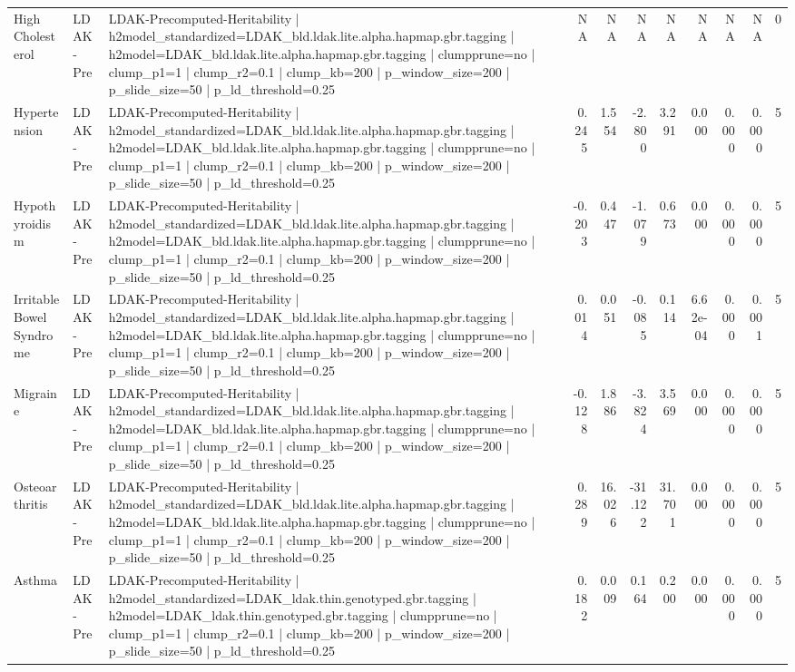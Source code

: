 \begin{landscape}
\begin{longtable}{p{2.4cm}p{1.8cm}p{6.0cm}rrrrrrrr}
High Cholesterol & LDAK-Pre & LDAK-Precomputed-Heritability | h2model\_standardized=LDAK\_bld.ldak.lite.alpha.hapmap.gbr.tagging | h2model=LDAK\_bld.ldak.lite.alpha.hapmap.gbr.tagging | clumpprune=no | clump\_p1=1 | clump\_r2=0.1 | clump\_kb=200 | p\_window\_size=200 | p\_slide\_size=50 | p\_ld\_threshold=0.25 & NA & NA & NA & NA & NA & NA & NA & 0 \\
Hypertension & LDAK-Pre & LDAK-Precomputed-Heritability | h2model\_standardized=LDAK\_bld.ldak.lite.alpha.hapmap.gbr.tagging | h2model=LDAK\_bld.ldak.lite.alpha.hapmap.gbr.tagging | clumpprune=no | clump\_p1=1 | clump\_r2=0.1 | clump\_kb=200 | p\_window\_size=200 | p\_slide\_size=50 | p\_ld\_threshold=0.25 & 0.245 & 1.554 & -2.800 & 3.291 & 0.000 & 0.000 & 0.000 & 5 \\
Hypothyroidism & LDAK-Pre & LDAK-Precomputed-Heritability | h2model\_standardized=LDAK\_bld.ldak.lite.alpha.hapmap.gbr.tagging | h2model=LDAK\_bld.ldak.lite.alpha.hapmap.gbr.tagging | clumpprune=no | clump\_p1=1 | clump\_r2=0.1 | clump\_kb=200 | p\_window\_size=200 | p\_slide\_size=50 | p\_ld\_threshold=0.25 & -0.203 & 0.447 & -1.079 & 0.673 & 0.000 & 0.000 & 0.000 & 5 \\
Irritable Bowel Syndrome & LDAK-Pre & LDAK-Precomputed-Heritability | h2model\_standardized=LDAK\_bld.ldak.lite.alpha.hapmap.gbr.tagging | h2model=LDAK\_bld.ldak.lite.alpha.hapmap.gbr.tagging | clumpprune=no | clump\_p1=1 | clump\_r2=0.1 | clump\_kb=200 | p\_window\_size=200 | p\_slide\_size=50 | p\_ld\_threshold=0.25 & 0.014 & 0.051 & -0.085 & 0.114 & 6.62e-04 & 0.000 & 0.001 & 5 \\
Migraine & LDAK-Pre & LDAK-Precomputed-Heritability | h2model\_standardized=LDAK\_bld.ldak.lite.alpha.hapmap.gbr.tagging | h2model=LDAK\_bld.ldak.lite.alpha.hapmap.gbr.tagging | clumpprune=no | clump\_p1=1 | clump\_r2=0.1 | clump\_kb=200 | p\_window\_size=200 | p\_slide\_size=50 | p\_ld\_threshold=0.25 & -0.128 & 1.886 & -3.824 & 3.569 & 0.000 & 0.000 & 0.000 & 5 \\
Osteoarthritis & LDAK-Pre & LDAK-Precomputed-Heritability | h2model\_standardized=LDAK\_bld.ldak.lite.alpha.hapmap.gbr.tagging | h2model=LDAK\_bld.ldak.lite.alpha.hapmap.gbr.tagging | clumpprune=no | clump\_p1=1 | clump\_r2=0.1 | clump\_kb=200 | p\_window\_size=200 | p\_slide\_size=50 | p\_ld\_threshold=0.25 & 0.289 & 16.026 & -31.122 & 31.701 & 0.000 & 0.000 & 0.000 & 5 \\
Asthma & LDAK-Pre & LDAK-Precomputed-Heritability | h2model\_standardized=LDAK\_ldak.thin.genotyped.gbr.tagging | h2model=LDAK\_ldak.thin.genotyped.gbr.tagging | clumpprune=no | clump\_p1=1 | clump\_r2=0.1 | clump\_kb=200 | p\_window\_size=200 | p\_slide\_size=50 | p\_ld\_threshold=0.25 & 0.182 & 0.009 & 0.164 & 0.200 & 0.000 & 0.000 & 0.000 & 5 \\

\end{longtable}
\end{landscape}
